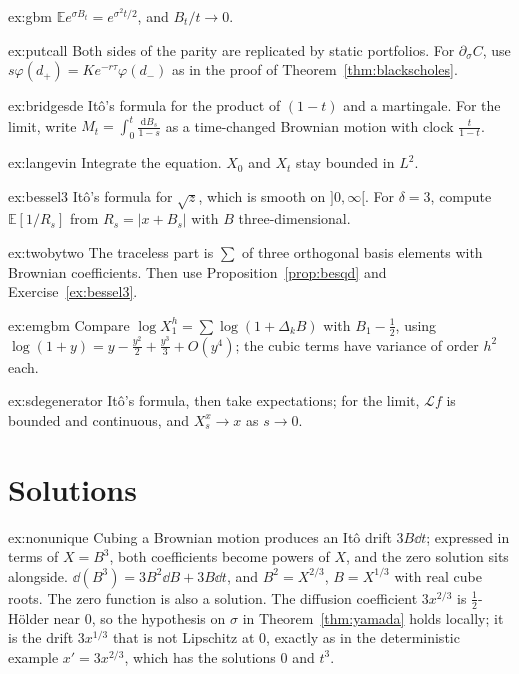 \begin{hint}{ex:gbm}
$\mathbb Ee^{\sigma B_t}=e^{\sigma^2t/2}$, and $B_t/t\to0$.
\end{hint}

\begin{hint}{ex:putcall}
Both sides of the parity are replicated by static portfolios. For $\partial_\sigma C$, use $s\varphi(d_+)=Ke^{-r\tau}\varphi(d_-)$ as in the proof of Theorem~\ref{thm:blackscholes}.
\end{hint}

\begin{hint}{ex:bridgesde}
It\^o's formula for the product of $(1-t)$ and a martingale. For the limit, write $M_t=\int_0^t\frac{\mathrm dB_s}{1-s}$ as a time-changed Brownian motion with clock $\frac t{1-t}$.
\end{hint}

\begin{hint}{ex:langevin}
Integrate the equation. $X_0$ and $X_t$ stay bounded in $L^2$.
\end{hint}

\begin{hint}{ex:bessel3}
It\^o's formula for $\sqrt z$, which is smooth on $]0,\infty[$. For $\delta=3$, compute $\mathbb E[1/R_s]$ from $R_s=|x+B_s|$ with $B$ three-dimensional.
\end{hint}

\begin{hint}{ex:twobytwo}
The traceless part is $\sum$ of three orthogonal basis elements with Brownian coefficients. Then use Proposition~\ref{prop:besqd} and Exercise~\ref{ex:bessel3}.
\end{hint}

\begin{hint}{ex:emgbm}
Compare $\log X^h_1=\sum\log(1+\Delta_kB)$ with $B_1-\frac12$, using $\log(1+y)=y-\frac{y^2}2+\frac{y^3}3+O(y^4)$; the cubic terms have variance of order $h^2$ each.
\end{hint}

\begin{hint}{ex:sdegenerator}
It\^o's formula, then take expectations; for the limit, $\mathcal Lf$ is bounded and continuous, and $X^x_s\to x$ as $s\to0$.
\end{hint}

\section{Solutions}

\begin{solution}{ex:nonunique}
\idea Cubing a Brownian motion produces an It\^o drift $3B\dd t$; expressed in terms of $X=B^3$, both coefficients become powers of $X$, and the zero solution sits alongside.
\writeup $\dd(B^3)=3B^2\dd B+3B\dd t$, and $B^2=X^{2/3}$, $B=X^{1/3}$ with real cube roots. The zero function is also a solution. The diffusion coefficient $3x^{2/3}$ is $\frac12$-H\"older near $0$, so the
hypothesis on $\sigma$ in Theorem~\ref{thm:yamada} holds locally; it is the drift $3x^{1/3}$ that is not Lipschitz at $0$, exactly as in the deterministic example $x'=3x^{2/3}$, which has the solutions $0$ and $t^3$.
\end{solution}

